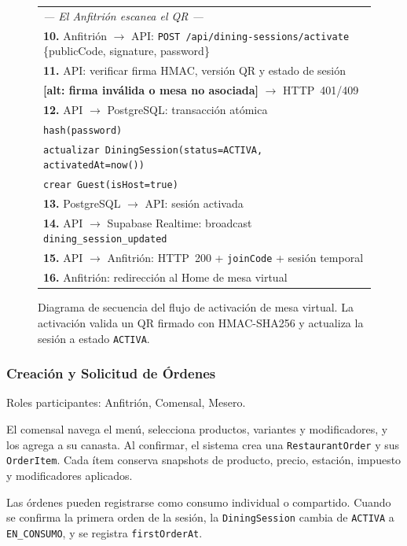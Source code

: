 \begin{figure}[ht]
{\begin{minipage}{0.92\textwidth}
\begin{tabular}{>{\raggedright\arraybackslash}p{13cm}}
\textit{--- El Anfitrión escanea el QR ---} \\[6pt]
\textbf{10.} Anfitrión $\rightarrow$ API: \texttt{POST /api/dining-sessions/activate} \{publicCode, signature, password\} \\
\textbf{11.} API: verificar firma HMAC, versión QR y estado de sesión \\
\quad\quad \textbf{[alt: firma inválida o mesa no asociada]} $\rightarrow$ HTTP~401/409 \\
\textbf{12.} API $\rightarrow$ PostgreSQL: transacción atómica \\
\quad\quad \texttt{hash(password)} \\
\quad\quad \texttt{actualizar DiningSession(status=ACTIVA, activatedAt=now())} \\
\quad\quad \texttt{crear Guest(isHost=true)} \\
\textbf{13.} PostgreSQL $\rightarrow$ API: sesión activada \\
\textbf{14.} API $\rightarrow$ Supabase Realtime: broadcast \texttt{dining\_session\_updated} \\
\textbf{15.} API $\rightarrow$ Anfitrión: HTTP~200 + \texttt{joinCode} + sesión temporal \\
\textbf{16.} Anfitrión: redirección al Home de mesa virtual \\
\end{tabular}
\end{minipage}
}
\caption{Diagrama de secuencia del flujo de activación de mesa virtual. La activación
valida un QR firmado con HMAC-SHA256 y actualiza la sesión a estado \texttt{ACTIVA}.}
\label{fig:seq_activacion}
\end{figure}

\subsubsection{Creación y Solicitud de Órdenes}

Roles participantes: Anfitrión, Comensal, Mesero.

El comensal navega el menú, selecciona productos, variantes y modificadores, y los agrega
a su canasta. Al confirmar, el sistema crea una \texttt{RestaurantOrder} y sus
\texttt{OrderItem}. Cada ítem conserva snapshots de producto, precio, estación, impuesto
y modificadores aplicados.

Las órdenes pueden registrarse como consumo individual o compartido. Cuando se confirma
la primera orden de la sesión, la \texttt{DiningSession} cambia de \texttt{ACTIVA} a
\texttt{EN\_CONSUMO}, y se registra \texttt{firstOrderAt}.

